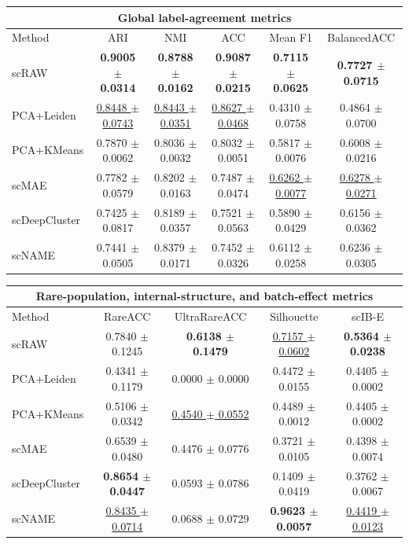 \documentclass[11pt,a4paper]{article}
\begin{document}
\begin{center}
{\small
\setlength{\tabcolsep}{4.5pt}
\renewcommand{\arraystretch}{1.05}
\begin{tabular}{lccccc}
\hline
\multicolumn{6}{c}{Global label-agreement metrics} \\
\hline
Method & ARI & NMI & ACC & Mean F1 & BalancedACC \\
\hline
scRAW & \textbf{0.9005 $\pm$ 0.0314} & \textbf{0.8788 $\pm$ 0.0162} & \textbf{0.9087 $\pm$ 0.0215} & \textbf{0.7115 $\pm$ 0.0625} & \textbf{0.7727 $\pm$ 0.0715} \\
PCA+Leiden & \underline{0.8448 $\pm$ 0.0743} & \underline{0.8443 $\pm$ 0.0351} & \underline{0.8627 $\pm$ 0.0468} & 0.4310 $\pm$ 0.0758 & 0.4864 $\pm$ 0.0700 \\
PCA+KMeans & 0.7870 $\pm$ 0.0062 & 0.8036 $\pm$ 0.0032 & 0.8032 $\pm$ 0.0051 & 0.5817 $\pm$ 0.0076 & 0.6008 $\pm$ 0.0216 \\
scMAE & 0.7782 $\pm$ 0.0579 & 0.8202 $\pm$ 0.0163 & 0.7487 $\pm$ 0.0474 & \underline{0.6262 $\pm$ 0.0077} & \underline{0.6278 $\pm$ 0.0271} \\
scDeepCluster & 0.7425 $\pm$ 0.0817 & 0.8189 $\pm$ 0.0357 & 0.7521 $\pm$ 0.0563 & 0.5890 $\pm$ 0.0429 & 0.6156 $\pm$ 0.0362 \\
scNAME & 0.7441 $\pm$ 0.0505 & 0.8379 $\pm$ 0.0171 & 0.7452 $\pm$ 0.0326 & 0.6112 $\pm$ 0.0258 & 0.6236 $\pm$ 0.0305 \\
\hline
\end{tabular}

\vspace{1em}

\begin{tabular}{lcccc}
\hline
\multicolumn{5}{c}{Rare-population, internal-structure, and batch-effect metrics} \\
\hline
Method & RareACC & UltraRareACC & Silhouette & scIB-E \\
\hline
scRAW & 0.7840 $\pm$ 0.1245 & \textbf{0.6138 $\pm$ 0.1479} & \underline{0.7157 $\pm$ 0.0602} & \textbf{0.5364 $\pm$ 0.0238} \\
PCA+Leiden & 0.4341 $\pm$ 0.1179 & 0.0000 $\pm$ 0.0000 & 0.4472 $\pm$ 0.0155 & 0.4405 $\pm$ 0.0002 \\
PCA+KMeans & 0.5106 $\pm$ 0.0342 & \underline{0.4540 $\pm$ 0.0552} & 0.4489 $\pm$ 0.0012 & 0.4405 $\pm$ 0.0002 \\
scMAE & 0.6539 $\pm$ 0.0480 & 0.4476 $\pm$ 0.0776 & 0.3721 $\pm$ 0.0105 & 0.4398 $\pm$ 0.0074 \\
scDeepCluster & \textbf{0.8654 $\pm$ 0.0447} & 0.0593 $\pm$ 0.0786 & 0.1409 $\pm$ 0.0419 & 0.3762 $\pm$ 0.0067 \\
scNAME & \underline{0.8435 $\pm$ 0.0714} & 0.0688 $\pm$ 0.0729 & \textbf{0.9623 $\pm$ 0.0057} & \underline{0.4419 $\pm$ 0.0123} \\
\hline
\end{tabular}
}
\end{center}
\end{document}
